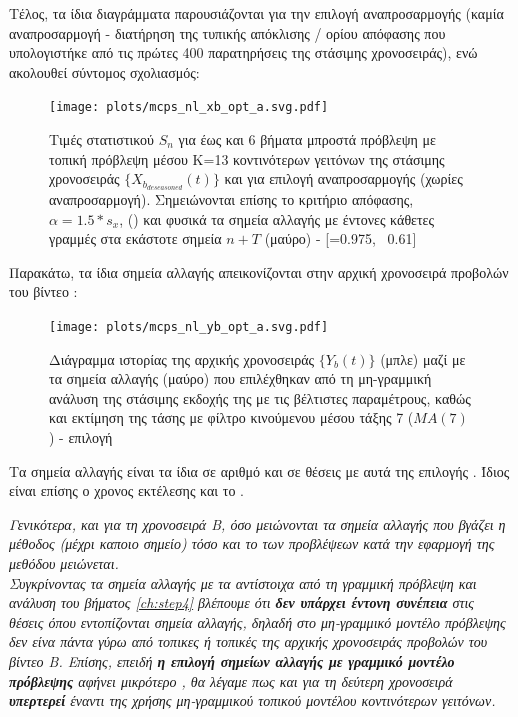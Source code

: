 Τέλος, τα ίδια διαγράμματα παρουσιάζονται για την επιλογή αναπροσαρμογής  (καμία αναπροσαρμογή - διατήρηση της τυπικής απόκλισης / ορίου απόφασης που υπολογιστήκε από τις πρώτες 400 παρατηρήσεις της στάσιμης χρονοσειράς), ενώ ακολουθεί σύντομος σχολιασμός:

\begin{figure}[H]
    \begin{center}
        \texttt{[image: plots/mcps\_nl\_xb\_opt\_a.svg.pdf]}
        \caption{Τιμές στατιστικού $S_n$ για έως και 6 βήματα μπροστά πρόβλεψη με τοπική πρόβλεψη μέσου Κ=13 κοντινότερων γειτόνων της στάσιμης χρονοσειράς $\{X_{b_{deseasoned}}(t)\}$ και για επιλογή αναπροσαρμογής  (χωρίες αναπροσαρμογή). Σημειώνονται επίσης το κριτήριο απόφασης, $\alpha=1.5*s_x$, () και φυσικά τα σημεία αλλαγής με έντονες κάθετες γραμμές στα εκάστοτε σημεία $n+T$ (μαύρο) - [=0.975, \ 0.61]}
        \label{fig:mcps_nl_xb_opt_a}
    \end{center}
\end{figure}

Παρακάτω, τα ίδια σημεία αλλαγής απεικονίζονται στην αρχική χρονοσειρά προβολών του βίντεο :

\begin{figure}[H]
    \begin{center}
        \texttt{[image: plots/mcps\_nl\_yb\_opt\_a.svg.pdf]}
        \caption{Διάγραμμα ιστορίας της αρχικής χρονοσειράς $\{Y_b(t)\}$ (μπλε) μαζί με τα σημεία αλλαγής (μαύρο) που επιλέχθηκαν από τη μη-γραμμική ανάλυση της στάσιμης εκδοχής της με τις βέλτιστες παραμέτρους, καθώς και εκτίμηση της τάσης με φίλτρο κινούμενου μέσου τάξης 7 ($MA(7)$ ) - επιλογή }
        \label{fig:mcps_nl_yb_opt_a}
    \end{center}
\end{figure}

Τα σημεία αλλαγής είναι τα ίδια σε αριθμό και σε θέσεις με αυτά της επιλογής . Ίδιος είναι επίσης ο χρονος εκτέλεσης και το .

\par \textit{Γενικότερα, και για τη χρονοσειρά Β, όσο μειώνονται τα σημεία αλλαγής που βγάζει η μέθοδος (μέχρι καποιο σημείο) τόσο και το  των προβλέψεων κατά την εφαρμογή της μεθόδου μειώνεται.\\
Συγκρίνοντας τα σημεία αλλαγής με τα αντίστοιχα από τη γραμμική πρόβλεψη και ανάλυση του βήματος \ref{ch:step4} βλέπουμε ότι \textbf{δεν υπάρχει έντονη συνέπεια} στις θέσεις όπου εντοπίζονται σημεία αλλαγής, δηλαδή στο μη-γραμμικό μοντέλο πρόβλεψης δεν είνα πάντα γύρω από τοπικες  ή τοπικές  της αρχικής χρονοσειράς προβολών του βίντεο Β. Επίσης, επειδή \textbf{η επιλογή σημείων αλλαγής με γραμμικό μοντέλο πρόβλεψης} αφήνει μικρότερο , θα λέγαμε πως και για τη δεύτερη χρονοσειρά \textbf{υπερτερεί} έναντι της χρήσης μη-γραμμικού τοπικού μοντέλου κοντινότερων γειτόνων.}
